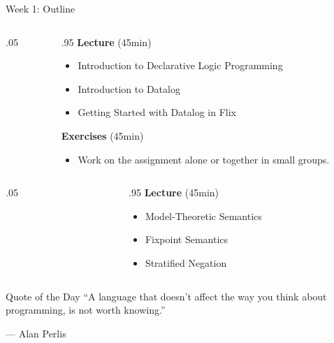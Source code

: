 \begin{frame}{Week 1: Outline}

\color{gray}
\begin{columns}
\begin{column}{.05\textwidth}
\end{column}
\begin{column}{.95\textwidth}
    \footnotesize
\textbf{Lecture} (45min)  \vspace{-2mm}
\begin{itemize}
    \color{gray}
    \setlength\itemsep{-0.5em}
    \item Introduction to Declarative Logic Programming
    \item Introduction to Datalog
    \item Getting Started with Datalog in Flix
\end{itemize}
\textbf{Exercises} (45min) \vspace{-2mm}
\begin{itemize}
    \color{gray}
    \item Work on the assignment alone or together in small groups.
\end{itemize}
\end{column}
\end{columns}

\medskip
\medskip
\medskip

\color{black}
\begin{columns}
\begin{column}{.05\textwidth}
\end{column}
\begin{column}{.95\textwidth}
\footnotesize
\textbf{Lecture} (45min) \vspace{-2mm}
\begin{itemize}
    \setlength\itemsep{-0.5em}
    \item Model-Theoretic Semantics
    \item Fixpoint Semantics
    \item Stratified Negation
\end{itemize}
\end{column}
\end{columns}
\end{frame}

\begin{frame}{Quote of the Day}
``A language that doesn't affect the way you think about programming, is not
worth knowing.''

\begin{flushright}
--- Alan Perlis
\end{flushright}
\end{frame}

